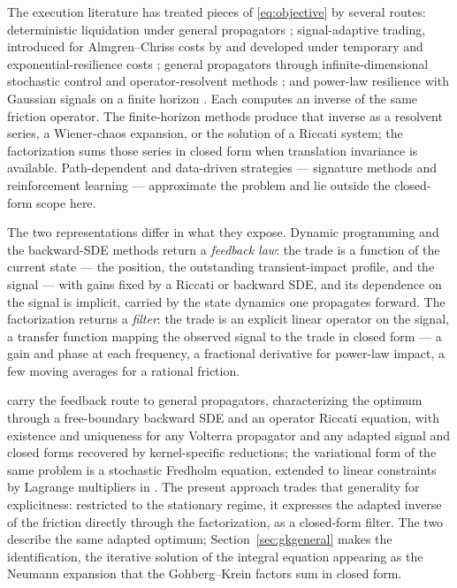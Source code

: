 \documentclass[11pt]{article}
\theoremstyle{plain}
\theoremstyle{definition}
\theoremstyle{remark}
\begin{document}
The execution literature has treated pieces of \eqref{eq:objective} by several routes: deterministic liquidation under general propagators \citep{GatheralSchiedSlynko2012}; signal-adaptive trading, introduced for Almgren--Chriss costs by \citet{CarteaJaimungal2013} and developed under temporary and exponential-resilience costs \citep{LehalleNeuman2019,NeumanVoss2022,BankSonerVoss2017}; general propagators through infinite-dimensional stochastic control \citep{AbiJaberNeuman2025} and operator-resolvent methods \citep{AbiJaberNeumanTuschmann2024}; and power-law resilience with Gaussian signals on a finite horizon \citep{FordeSanchezSmith2022}. Each computes an inverse of the same friction operator. The finite-horizon methods produce that inverse as a resolvent series, a Wiener-chaos expansion, or the solution of a Riccati system; the factorization sums those series in closed form when translation invariance is available. Path-dependent and data-driven strategies --- signature methods \citep{KalsiLyonsPerezArribas2020} and reinforcement learning --- approximate the problem and lie outside the closed-form scope here.

The two representations differ in what they expose. Dynamic programming and the backward-SDE methods return a \emph{feedback law}: the trade is a function of the current state --- the position, the outstanding transient-impact profile, and the signal --- with gains fixed by a Riccati or backward SDE, and its dependence on the signal is implicit, carried by the state dynamics one propagates forward. The factorization returns a \emph{filter}: the trade is an explicit linear operator on the signal, a transfer function mapping the observed signal to the trade in closed form --- a gain and phase at each frequency, a fractional derivative for power-law impact, a few moving averages for a rational friction.

\citet{AbiJaberNeuman2025} carry the feedback route to general propagators, characterizing the optimum through a free-boundary backward SDE and an operator Riccati equation, with existence and uniqueness for any Volterra propagator and any adapted signal and closed forms recovered by kernel-specific reductions; the variational form of the same problem is a stochastic Fredholm equation, extended to linear constraints by Lagrange multipliers in \citet{AbiJaberDeCarvalhoPham2024}. The present approach trades that generality for explicitness: restricted to the stationary regime, it expresses the adapted inverse of the friction directly through the factorization, as a closed-form filter. The two describe the same adapted optimum; Section~\ref{sec:gkgeneral} makes the identification, the iterative solution of the integral equation appearing as the Neumann expansion that the Gohberg--Krein factors sum in closed form.
\end{document}
